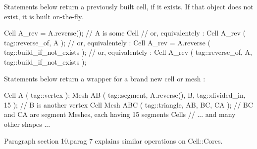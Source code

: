 Statements below return a previously built cell, if it exists.
If that object does not exist, it is built on-the-fly.

\verbatim
   Cell A_rev = A.reverse();  // A is some Cell
   // or, equivalentely :
   Cell A_rev ( tag::reverse_of, A );
   // or, equivalentely :
   Cell A_rev = A.reverse ( tag::build_if_not_exists );
   // or, equivalentely :
   Cell A_rev ( tag::reverse_of, A, tag::build_if_not_exists );
\endverbatim

Statements below return a wrapper for a brand new cell or mesh :

\verbatim
   Cell A ( tag::vertex );
   Mesh AB ( tag::segment, A.reverse(), B, tag::divided_in, 15 );
   // B is another vertex Cell
   Mesh ABC ( tag::triangle, AB, BC, CA );
   //  BC and CA are segment Meshes, each having 15 segments Cells
   // ... and many other shapes ...
\endverbatim

Paragraph \numb section 10.\numb parag 7 explains similar operations on {\codett Cell::Core}s.


